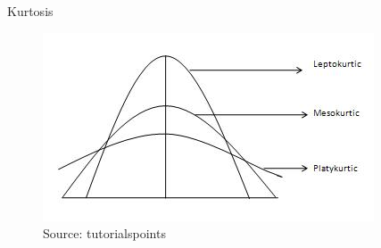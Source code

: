 \documentclass[handout]{beamer}
\begin{document}
\begin{frame}{Kurtosis}



   \begin{figure}[h!]
	\centering
	\includegraphics[scale=0.9]{pics/kurtosis.jpg}
     \caption{Source: tutorialspoints}
	\end{figure} 
 
 




 
\end{frame}
\end{document}
